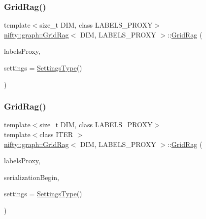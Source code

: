 \subsubsection{\texorpdfstring{Grid\+Rag()}{GridRag()}\hspace{0.1cm}{\footnotesize\ttfamily [1/3]}}
{\footnotesize\ttfamily template$<$size\+\_\+t D\+IM, class L\+A\+B\+E\+L\+S\+\_\+\+P\+R\+O\+XY$>$ \\
\hyperlink{classnifty_1_1graph_1_1GridRag}{nifty\+::graph\+::\+Grid\+Rag}$<$ D\+IM, L\+A\+B\+E\+L\+S\+\_\+\+P\+R\+O\+XY $>$\+::\hyperlink{classnifty_1_1graph_1_1GridRag}{Grid\+Rag} (\begin{DoxyParamCaption}\item[{const \hyperlink{classnifty_1_1graph_1_1GridRag_ad3146f72301da4f45b51e3b692776cf1}{Labels\+Proxy} \&}]{labels\+Proxy,  }\item[{const \hyperlink{structnifty_1_1graph_1_1GridRag_1_1SettingsType}{Settings\+Type} \&}]{settings = {\ttfamily \hyperlink{structnifty_1_1graph_1_1GridRag_1_1SettingsType}{Settings\+Type}()} }\end{DoxyParamCaption})\hspace{0.3cm}{\ttfamily [inline]}}

\mbox{\label{classnifty_1_1graph_1_1GridRag_adcc1771b68011ee041bdf83180f72e73}} 
\subsubsection{\texorpdfstring{Grid\+Rag()}{GridRag()}\hspace{0.1cm}{\footnotesize\ttfamily [2/3]}}
{\footnotesize\ttfamily template$<$size\+\_\+t D\+IM, class L\+A\+B\+E\+L\+S\+\_\+\+P\+R\+O\+XY$>$ \\
template$<$class I\+T\+ER $>$ \\
\hyperlink{classnifty_1_1graph_1_1GridRag}{nifty\+::graph\+::\+Grid\+Rag}$<$ D\+IM, L\+A\+B\+E\+L\+S\+\_\+\+P\+R\+O\+XY $>$\+::\hyperlink{classnifty_1_1graph_1_1GridRag}{Grid\+Rag} (\begin{DoxyParamCaption}\item[{const \hyperlink{classnifty_1_1graph_1_1GridRag_ad3146f72301da4f45b51e3b692776cf1}{Labels\+Proxy} \&}]{labels\+Proxy,  }\item[{I\+T\+ER}]{serialization\+Begin,  }\item[{const \hyperlink{structnifty_1_1graph_1_1GridRag_1_1SettingsType}{Settings\+Type} \&}]{settings = {\ttfamily \hyperlink{structnifty_1_1graph_1_1GridRag_1_1SettingsType}{Settings\+Type}()} }\end{DoxyParamCaption})\hspace{0.3cm}{\ttfamily [inline]}}

